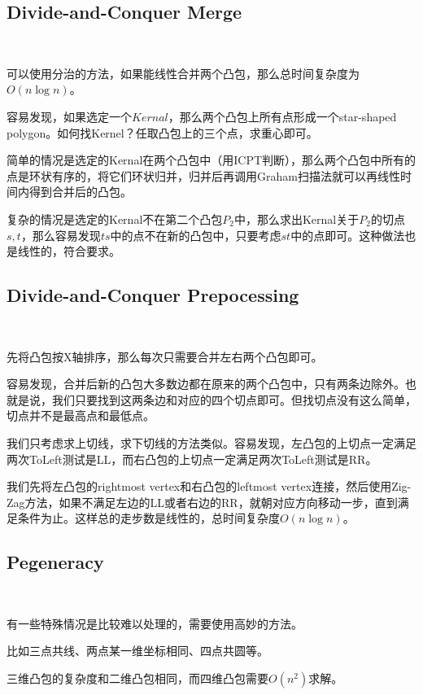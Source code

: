 \documentclass[12pt]{article}
\begin{document}
\begin{CJK*}{GBK}{song}
        \subsection{Divide-and-Conquer Merge}\
            \par 可以使用分治的方法，如果能线性合并两个凸包，那么总时间复杂度为$O(n\log n)$。
            \par 容易发现，如果选定一个$Kernal$，那么两个凸包上所有点形成一个star-shaped polygon。如何找Kernel？任取凸包上的三个点，求重心即可。
            \par 简单的情况是选定的Kernal在两个凸包中（用ICPT判断），那么两个凸包中所有的点是环状有序的，将它们环状归并，归并后再调用Graham扫描法就可以再线性时间内得到合并后的凸包。
            \par 复杂的情况是选定的Kernal不在第二个凸包$P_2$中，那么求出Kernal关于$P_2$的切点$s,t$，那么容易发现$ts$中的点不在新的凸包中，只要考虑$st$中的点即可。这种做法也是线性的，符合要求。
        \subsection{Divide-and-Conquer Prepocessing}\
            \par 先将凸包按X轴排序，那么每次只需要合并左右两个凸包即可。
            \par 容易发现，合并后新的凸包大多数边都在原来的两个凸包中，只有两条边除外。也就是说，我们只要找到这两条边和对应的四个切点即可。但找切点没有这么简单，切点并不是最高点和最低点。
            \par 我们只考虑求上切线，求下切线的方法类似。容易发现，左凸包的上切点一定满足两次ToLeft测试是LL，而右凸包的上切点一定满足两次ToLeft测试是RR。
            \par 我们先将左凸包的rightmost vertex和右凸包的leftmost vertex连接，然后使用Zig-Zag方法，如果不满足左边的LL或者右边的RR，就朝对应方向移动一步，直到满足条件为止。这样总的走步数是线性的，总时间复杂度$O(n\log n)$。
        \subsection{Pegeneracy}\
            \par 有一些特殊情况是比较难以处理的，需要使用高妙的方法。
            \par 比如三点共线、两点某一维坐标相同、四点共圆等。
            \par 三维凸包的复杂度和二维凸包相同，而四维凸包需要$O(n^2)$求解。
\end{CJK*}
\end{document}
